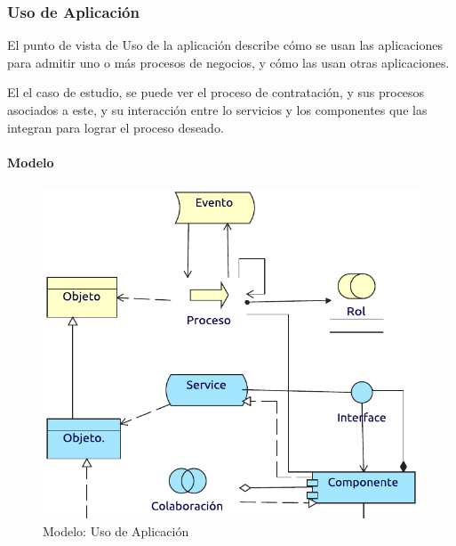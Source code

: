 







\newpage

\subsubsection{Uso de Aplicación}

El punto de vista de Uso de la aplicación describe cómo se usan las aplicaciones para admitir uno o más procesos de negocios, y cómo las usan otras aplicaciones. \vspace{\baselineskip}

El el caso de estudio, se puede ver el proceso de contratación, y sus procesos asociados a este, y su interacción entre lo servicios y los componentes que las integran para lograr el proceso deseado.
\paragraph{Modelo}
\begin{figure}[h!]
	\centering
	\includegraphics[width=0.9\linewidth]{Desarrollo/ArquitecturaEmpresarial/Aplicacion/imgs/uso.pdf}
	\caption{Modelo: Uso de Aplicación}
\end{figure}
\newpage
